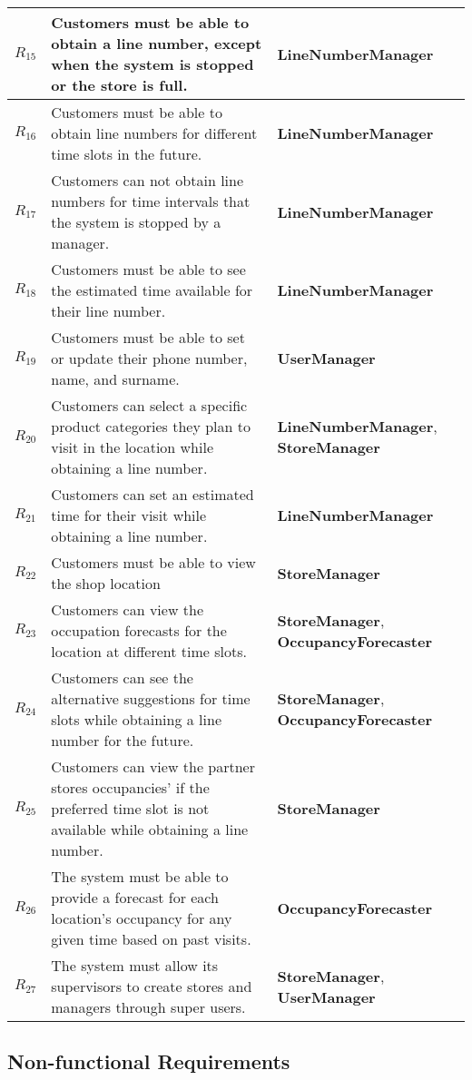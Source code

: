 \begin{table}[H]
\begin{tabular}{|p{2cm}|p{10cm}|p{4cm}|}
        $R_{15}$ & Customers must be able to obtain a line number, except when the system is stopped or the store is full. & \textbf{LineNumberManager} \\ \hline
        $R_{16}$ & Customers must be able to obtain line numbers for different time slots in the future. &  \textbf{LineNumberManager} \\ \hline
        $R_{17}$ & Customers can not obtain line numbers for time intervals that the system is stopped by a manager. & \textbf{LineNumberManager} \\ \hline
        $R_{18}$ & Customers must be able to see the estimated time available for their line number. & \textbf{LineNumberManager} \\ \hline
        $R_{19}$ & Customers must be able to set or update their phone number, name, and surname. & \textbf{UserManager} \\ \hline
        $R_{20}$ & Customers can select a specific product categories they plan to visit in the location while obtaining a line number. & \textbf{LineNumberManager}, \textbf{StoreManager} \\ \hline
        $R_{21}$ & Customers can set an estimated time for their visit while obtaining a line number. & \textbf{LineNumberManager} \\ \hline
        $R_{22}$ & Customers must be able to view the shop location & \textbf{StoreManager} \\ \hline
        $R_{23}$ & Customers can view the occupation forecasts for the location at different time slots. & \textbf{StoreManager}, \textbf{OccupancyForecaster} \\ \hline
        $R_{24}$ & Customers can see the alternative suggestions for time slots while obtaining a line number for the future. & \textbf{StoreManager}, \textbf{OccupancyForecaster} \\ \hline
        $R_{25}$ & Customers can view the partner stores occupancies' if the preferred time slot is not available while obtaining a line number. & \textbf{StoreManager} \\ \hline
        $R_{26}$ & The system must be able to provide a forecast for each location's occupancy for any given time based on past visits. & \textbf{OccupancyForecaster} \\ \hline
        $R_{27}$ & The system must allow its supervisors to create stores and managers through super users. & \textbf{StoreManager}, \textbf{UserManager} \\ \hline
    \end{tabular}
\end{table}
\subsection{Non-functional Requirements}

